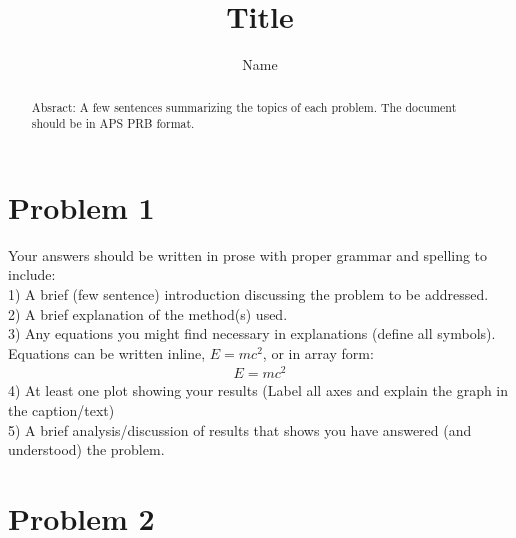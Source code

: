 \documentclass[prb,twocolumn]{revtex4}
\begin{document}
\title{Title}

\author{Name}


\begin{abstract}
Absract: A few sentences summarizing the topics of each problem.  The document should be in APS PRB format.  
\end{abstract}

\maketitle

\section{Problem 1}

\noindent
Your answers should be written in prose with proper grammar and spelling to include:\\
1) A brief (few sentence) introduction discussing the problem to be addressed.\\
2) A brief explanation of the method(s) used.\\
3) Any equations you might find necessary in explanations (define all symbols).  Equations can be written inline, $E=mc^{2}$, or in array form:
\begin{eqnarray}
E=mc^{2}
\label{nameforequation}
\end{eqnarray}
4) At least one plot showing your results (Label all axes and explain the graph in the caption/text) \\
5) A brief analysis/discussion of results that shows you have answered (and understood) the problem.  \\



\section{Problem 2}
\end{document}
